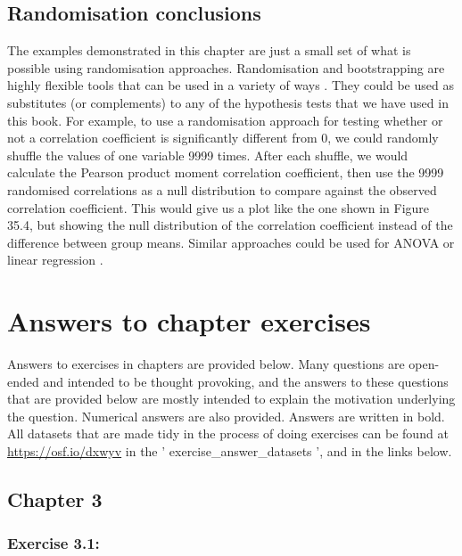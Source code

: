\documentclass[
  openany]{krantz}
\begin{document}
\hypertarget{randomisation-conclusions}{%
\section{Randomisation conclusions}\label{randomisation-conclusions}}

The examples demonstrated in this chapter are just a small set of what is possible using randomisation approaches.
Randomisation and bootstrapping are highly flexible tools that can be used in a variety of ways \citep{Manly2007}.
They could be used as substitutes (or complements) to any of the hypothesis tests that we have used in this book.
For example, to use a randomisation approach for testing whether or not a correlation coefficient is significantly different from 0, we could randomly shuffle the values of one variable 9999 times.
After each shuffle, we would calculate the Pearson product moment correlation coefficient, then use the 9999 randomised correlations as a null distribution to compare against the observed correlation coefficient.
This would give us a plot like the one shown in Figure 35.4, but showing the null distribution of the correlation coefficient instead of the difference between group means.
Similar approaches could be used for ANOVA or linear regression \citep{Manly2007}.

\hypertarget{appendix-appendix}{%
\appendix {}}


\hypertarget{appendexA}{%
\chapter{Answers to chapter exercises}\label{appendexA}}

Answers to exercises in chapters are provided below.
Many questions are open-ended and intended to be thought provoking, and the answers to these questions that are provided below are mostly intended to explain the motivation underlying the question.
Numerical answers are also provided.
Answers are written in bold.
All datasets that are made tidy in the process of doing exercises can be found at \url{https://osf.io/dxwyv} in the ' exercise\_answer\_datasets ', and in the links below.

\hypertarget{chapter-3}{%
\section{Chapter 3}\label{chapter-3}}

\hypertarget{exercise-3.1}{%
\subsection{Exercise 3.1:}\label{exercise-3.1}}
\end{document}
